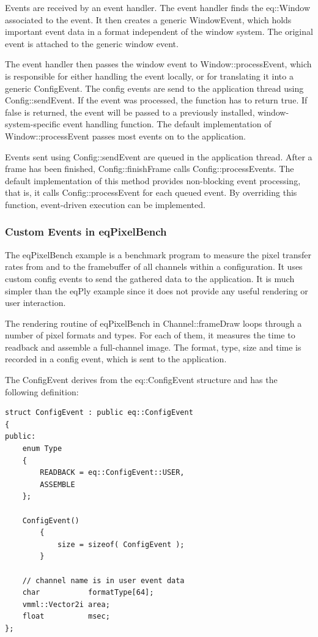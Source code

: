 \documentclass[10pt,a4]{scrartcl}
\begin{document}
Events are received by an event handler. The event handler finds the
\textsf{eq::Window} associated to the event. It then creates a generic
\textsf{WindowEvent}, which holds important event data in a format
independent of the window system. The original event is attached to the
generic window event.

The event handler then passes the window event to
\textsf{Window::processEvent}, which is responsible for either handling
the event locally, or for translating it into a generic
\textsf{ConfigEvent}. The config events are send to the application
thread using \textsf{Config::sendEvent}. If the event was processed, the
function has to return \textsf{true}. If \textsf{false} is returned, the
event will be passed to a previously installed, window-system-specific
event handling function. The default implementation of
\textsf{Window::processEvent} passes most events on to the application.

Events sent using \textsf{Config::sendEvent} are queued in the
application thread. After a frame has been finished,
\textsf{Config::finishFrame} calls \textsf{Config::processEvents}. The
default implementation of this method provides non-blocking event
processing, that is, it calls \textsf{Config::processEvent} for each
queued event. By overriding this function, event-driven execution can be
implemented.

\subsubsection{Custom Events in eqPixelBench}

The \textsf{eqPixelBench} example is a benchmark program to measure the
pixel transfer rates from and to the framebuffer of all channels within
a configuration. It uses custom config events to send the gathered data
to the application. It is much simpler than the \textsf{eqPly} example
since it does not provide any useful rendering or user interaction.

The rendering routine of \textsf{eqPixelBench} in
\textsf{Channel::frameDraw} loops through a number of pixel formats and
types. For each of them, it measures the time to readback and assemble a
full-channel image. The format, type, size and time is recorded in a
config event, which is sent to the application.

The \textsf{ConfigEvent} derives from the \textsf{eq::ConfigEvent}
structure and has the following definition:

{\footnotesize\begin{lstlisting}
struct ConfigEvent : public eq::ConfigEvent
{
public:
    enum Type
    {
        READBACK = eq::ConfigEvent::USER,
        ASSEMBLE
    };

    ConfigEvent()
        {
            size = sizeof( ConfigEvent );
        }

    // channel name is in user event data
    char           formatType[64];
    vmml::Vector2i area;
    float          msec;
};
\end{lstlisting}}
\end{document}
